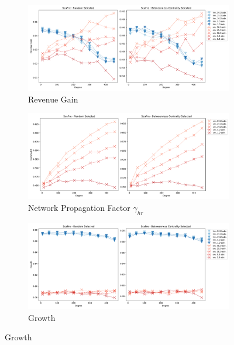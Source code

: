 \begin{figure}[tbp]
	 \begin{subfigure}[b]{\textwidth}
		\includegraphics[width=\textwidth]{figures/sm_edge_revenue_barabasi.pdf}
		\caption{Revenue Gain}
		\label{fig:sm_edge_rev_bara}
	\end{subfigure}
	\begin{subfigure}[b]{\textwidth}
		\includegraphics[width=\textwidth]{figures/sm_edge_gamma_barabasi.pdf}
		\caption{Network Propagation Factor $\gamma_{hr}$}
		\label{fig:sm_edge_gamma_bara}
	\end{subfigure}
	\begin{subfigure}[b]{\textwidth}
		\includegraphics[width=\textwidth]{figures/sm_edge_growth_barabasi.pdf}
		\caption{Growth}
		\label{fig:growth_bara}
	\end{subfigure}
\end{figure}
